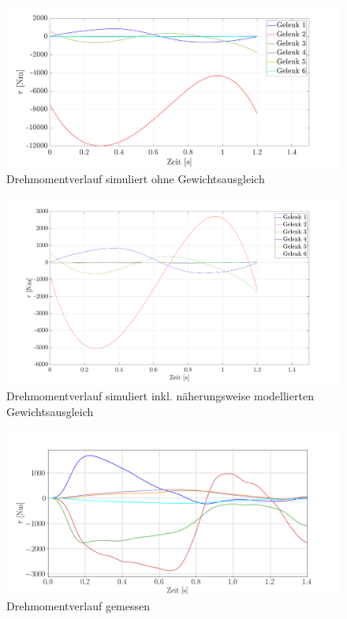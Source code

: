 %
\begin{figure}[tbph]
	\centering
	\includegraphics[width=1\linewidth]{images/taumat}
	\caption{Drehmomentverlauf simuliert ohne Gewichtsausgleich}
	\label{fig:taumat}
\end{figure}
%
\begin{figure}[tbph]
	\centering
	\includegraphics[width=0.9\linewidth]{images/taumat-fg}
	\caption{Drehmomentverlauf simuliert inkl. näherungsweise modellierten Gewichtsausgleich}
	\label{fig:taumat-fg}
\end{figure}
%
\begin{figure}[tbph]
	\centering
	\includegraphics[width=1\linewidth]{images/tau}
	\caption{Drehmomentverlauf gemessen}
	\label{fig:tau}
\end{figure}
%
